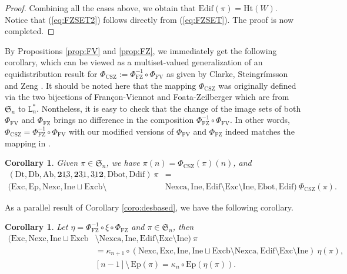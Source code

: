 \documentclass[12pt]{amsart}
\numberwithin{equation}{section}
\theoremstyle{plain}
\newtheorem{corollary}[theorem]{Corollary}
\theoremstyle{definition}
\def\FV{\mathrm{FV}}
\def\FZ{\mathrm{FZ}}
\def\CSZ{\mathrm{CSZ}}
\def\SS{\mathfrak{S}}
\def\Het{\mathrm{Ht}}
\def\Db{\mathrm{Db}}
\def\Ab{\mathrm{Ab}}
\def\Dt{\mathrm{Dt}}
\def\Ddif{\mathrm{Ddif}}
\def\Dbot{\mathrm{Dbot}}
\def\rightascent{{\mathbf{2}\underline{13}}}
\def\leftdescent{\mathrm{\underline{31}}\mathbf{2}}
\def\rightdescent{\mathrm{\mathbf{2}\underline{31}}}
\def\Edif{\mathrm{Edif}}
\def\Excp{\mathrm{Ep}}
\def\Exc{\mathrm{Exc}}
\def\Nexc{\mathrm{Nexc}}
\def\Excpb{\mathrm{Epb}}
\def\Nexcb{\mathrm{Nexcb}}
\def\Nexca{\mathrm{Nexca}}
\def\Excb{\mathrm{Excb}}
\def\Exca{\mathrm{Exca}}
\def\Ine{\mathrm{Ine}}
\def\Ebot{\mathrm{Ebot}}
\def\Inv{\mathrm{Inv}}
\def\Madl{\mathrm{Madl}}
\begin{document}
\begin{proof}
Combining all the cases above, we obtain that $\Edif(\pi)=\Het(W)$. Notice that (\ref{eq:FZSET2})  follows directly from (\ref{eq:FZSET}). The proof is now completed.
\end{proof}


By Propositions \ref{prop:FV} and \ref{prop:FZ}, we immediately get the following corollary, which can be viewed as a multiset-valued generalization of an equidistribution result for $\Phi_{\CSZ}:=\Phi_{\FZ}^{-1} \circ \Phi_{\FV}$ as given by Clarke, Steingr\'{i}msson and Zeng \cite{CSZ}. It should be noted here that the mapping $\Phi_{\CSZ}$ was originally defined via the two bijections of Fran\c con-Viennot and Foata-Zeilberger which are from $\SS_n$ to $\mathtt{L}_n^*$. Nontheless, it is easy to check that
the change of the image sets of both $\Phi_{\FV}$ and $\Phi_{\FZ}$ brings no difference in the composition $\Phi_{\FZ}^{-1} \circ \Phi_{\FV}$. In other words, $\Phi_{\CSZ}= \Phi_{\FZ}^{-1} \circ \Phi_{\FV}$ with our modified versions of $\Phi_{\FV}$ and $\Phi_{\FZ}$ indeed matches the mapping in \cite{CSZ}.



\begin{corollary}
Given $\pi \in \SS_n$, we have $\pi(n)=\Phi_{\CSZ}(\pi)(n)$, and
\begin{align*}
  (\Dt,\Db,\Ab,\rightascent, \rightdescent, \leftdescent,\Dbot,\Ddif)\:\pi&= \\[3pt]
(\Exc,\Excp,\Nexc,\Ine \sqcup \Excb \setminus &\Nexca, \Ine, \Edif \setminus \Exc \setminus \Ine,\Ebot,\Edif) \:\Phi_{\CSZ}(\pi).
\end{align*}
\end{corollary}

As a parallel result of Corollary \ref{coro:desbased},
we have the following corollary.



\begin{corollary}
Let $\eta=\Phi_{\FZ}^{-1}\circ \xi \circ \Phi_{\FZ}$ and $\pi \in \SS_n$, then
\begin{align*}
  (\Exc,\Nexc,\Ine \sqcup \Excb& \setminus \Nexca ,\Ine,\Edif \setminus \Exc \setminus \Ine) \: \pi \\[4pt]
&=\kappa_{n+1}\circ(\Nexc,\Exc,\Ine,\Ine \sqcup \Excb \setminus \Nexca ,\Edif \setminus \Exc \setminus \Ine) \:\eta(\pi),\\[4pt]
&[n-1] \setminus\,  \Excp(\pi)=  \kappa_n\circ\Excp(\eta(\pi)).
\end{align*}
\end{corollary}
\end{document}
